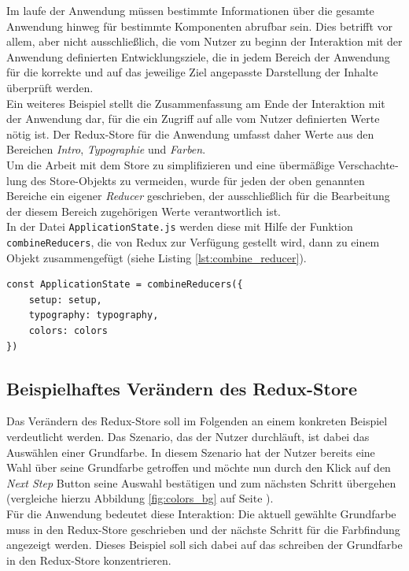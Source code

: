 Im laufe der Anwendung müssen bestimmte Informationen über die gesamte Anwendung hinweg für bestimmte Komponenten abrufbar sein. Dies betrifft vor allem, aber nicht ausschließlich, die vom Nutzer zu beginn der Interaktion mit der Anwendung definierten Entwicklungsziele, die in jedem Bereich der Anwendung für die korrekte und auf das jeweilige Ziel angepasste Darstellung der  Inhalte überprüft werden.\\
Ein weiteres Beispiel stellt die Zusammenfassung am Ende der Interaktion mit der Anwendung dar, für die ein Zugriff auf alle vom Nutzer definierten Werte nötig ist. Der Redux-Store für die Anwendung umfasst daher Werte aus den Bereichen \textit{Intro}, \textit{Typographie} und \textit{Farben}.\\

Um die Arbeit mit dem Store zu simplifizieren und eine übermäßige Ver­schach­te­lung des Store-Objekts zu vermeiden, wurde für jeden der oben genannten Bereiche ein eigener \textit{Reducer} geschrieben, der ausschließlich für die Bearbeitung der diesem Bereich zugehörigen Werte verantwortlich ist.\\
In der Datei \verb|ApplicationState.js| werden diese mit Hilfe der Funktion \verb|combineReducers|, die von Redux zur Verfügung gestellt wird, dann zu einem Objekt zusammengefügt (siehe Listing \ref{lst:combine_reducer}).

\begin{lstlisting}[caption={Zusammenfügen der dedizierten Reducer zu einem Objekt}, label=lst:combine_reducer]
  const ApplicationState = combineReducers({
    setup: setup,
    typography: typography,
    colors: colors
})
\end{lstlisting}

\subsection{Beispielhaftes Verändern des Redux-Store}
Das Verändern des Redux-Store soll im Folgenden an einem konkreten Beispiel verdeutlicht werden. Das Szenario, das der Nutzer durchläuft, ist dabei das Auswählen einer Grundfarbe. In diesem Szenario hat der Nutzer bereits eine Wahl über seine Grundfarbe getroffen und möchte nun durch den Klick auf den \textit{Next Step} Button seine Auswahl bestätigen und zum nächsten Schritt übergehen (vergleiche hierzu Abbildung \ref{fig:colors_bg} auf Seite \pageref{fig:colors_bg}).\\
Für die Anwendung bedeutet diese Interaktion: Die aktuell gewählte Grundfarbe muss in den Redux-Store geschrieben\footnotemark{} und der nächste Schritt für die Farbfindung angezeigt werden. Dieses Beispiel soll sich dabei auf das schreiben der Grundfarbe in den Redux-Store konzentrieren.\\

